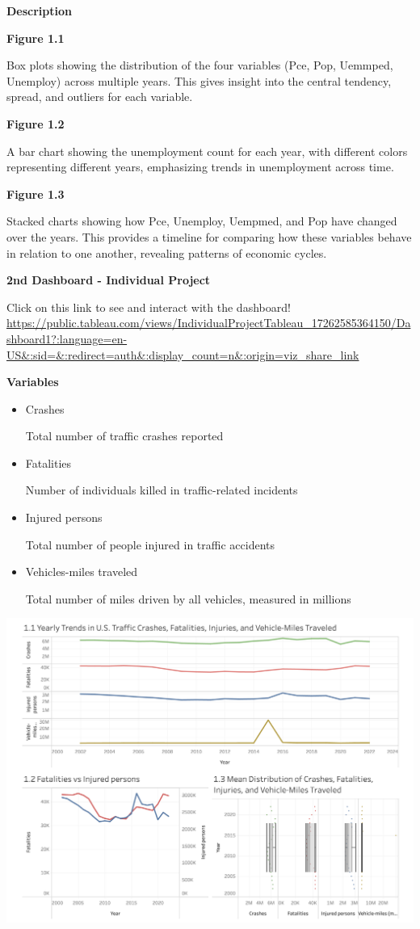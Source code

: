 \documentclass[
  letterpaper,
  DIV=11,
  numbers=noendperiod]{scrreprt}
\begin{document}
\textbf{Description}

\textbf{Figure 1.1}

Box plots showing the distribution of the four variables (Pce, Pop,
Uemmped, Unemploy) across multiple years. This gives insight into the
central tendency, spread, and outliers for each variable.

\textbf{Figure 1.2}

A bar chart showing the unemployment count for each year, with different
colors representing different years, emphasizing trends in unemployment
across time.

\textbf{Figure 1.3}

Stacked charts showing how Pce, Unemploy, Uempmed, and Pop have changed
over the years. This provides a timeline for comparing how these
variables behave in relation to one another, revealing patterns of
economic cycles.

\textbf{2nd Dashboard - Individual Project}

Click on this link to see and interact with the dashboard!
\url{https://public.tableau.com/views/IndividualProjectTableau_17262585364150/Dashboard1?:language=en-US&:sid=&:redirect=auth&:display_count=n&:origin=viz_share_link}

\textbf{Variables}

\begin{itemize}
\item
  Crashes

  Total number of traffic crashes reported
\item
  Fatalities

  Number of individuals killed in traffic-related incidents
\item
  Injured persons

  Total number of people injured in traffic accidents
\item
  Vehicles-miles traveled

  Total number of miles driven by all vehicles, measured in millions
\end{itemize}

\includegraphics{./dashboard-indivproject.png}
\end{document}
